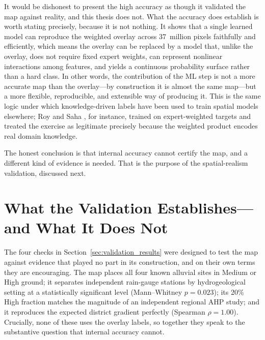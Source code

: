 It would be dishonest to present the high accuracy as though it validated the map
against reality, and this thesis does not. What the accuracy does establish is
worth stating precisely, because it is not nothing. It shows that a single learned
model can reproduce the weighted overlay across 37~million pixels faithfully and
efficiently, which means the overlay can be replaced by a model that, unlike the
overlay, does not require fixed expert weights, can represent nonlinear
interactions among features, and yields a continuous probability surface rather
than a hard class. In other words, the contribution of the ML step is not a more
accurate map than the overlay---by construction it is almost the same map---but a
more flexible, reproducible, and extensible way of producing it. This is the same
logic under which knowledge-driven labels have been used to train spatial models
elsewhere; Roy and Saha \cite{roy2019knowledgedriven}, for instance, trained on
expert-weighted targets and treated the exercise as legitimate precisely because
the weighted product encodes real domain knowledge.

The honest conclusion is that internal accuracy cannot certify the map, and a
different kind of evidence is needed. That is the purpose of the spatial-realism
validation, discussed next.

\section{What the Validation Establishes---and What It Does Not}
\label{sec:discuss_validation}

The four checks in Section~\ref{sec:validation_results} were designed to test the
map against evidence that played no part in its construction, and on their own
terms they are encouraging. The map places all four known alluvial sites in
Medium or High ground; it separates independent rain-gauge stations by
hydrogeological setting at a statistically significant level (Mann--Whitney
$p = 0.023$); its 20\% High fraction matches the magnitude of an independent
regional AHP study; and it reproduces the expected district gradient perfectly
(Spearman $\rho = 1.00$). Crucially, none of these uses the overlay labels, so
together they speak to the substantive question that internal accuracy cannot.

